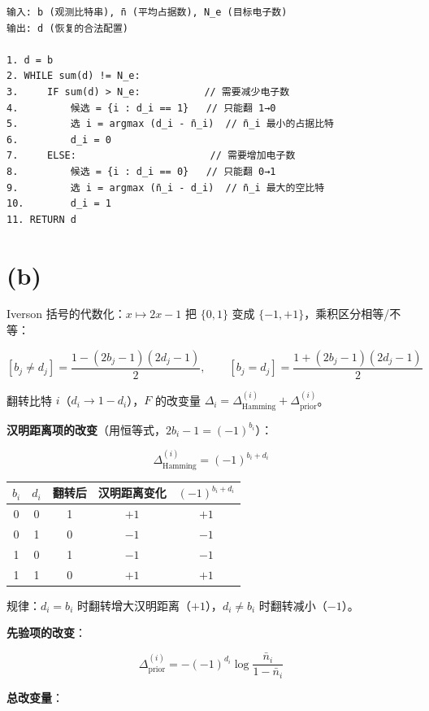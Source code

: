 \documentclass[11pt,a4paper]{article}
\begin{document}
\begin{verbatim}
输入: b (观测比特串), n̄ (平均占据数), N_e (目标电子数)
输出: d (恢复的合法配置)

1. d = b
2. WHILE sum(d) != N_e:
3.     IF sum(d) > N_e:           // 需要减少电子数
4.         候选 = {i : d_i == 1}   // 只能翻 1→0
5.         选 i = argmax (d_i - n̄_i)  // n̄_i 最小的占据比特
6.         d_i = 0
7.     ELSE:                       // 需要增加电子数
8.         候选 = {i : d_i == 0}   // 只能翻 0→1
9.         选 i = argmax (n̄_i - d_i)  // n̄_i 最大的空比特
10.        d_i = 1
11. RETURN d
\end{verbatim}

\section{(b) }

Iverson 括号的代数化：$x \mapsto 2x-1$ 把 $\{0,1\}$ 变成 $\{-1,+1\}$，乘积区分相等/不等：

$$\boxed{[b_j \neq d_j] = \frac{1 - (2b_j-1)(2d_j-1)}{2}}, \qquad \boxed{[b_j = d_j] = \frac{1 + (2b_j-1)(2d_j-1)}{2}}$$


翻转比特 $i$（$d_i \to 1-d_i$），$F$ 的改变量 $\Delta_i = \Delta_{\text{Hamming}}^{(i)} + \Delta_{\text{prior}}^{(i)}$。

\textbf{汉明距离项的改变}（用恒等式，$2b_i-1 = (-1)^{b_i}$）：

$$\Delta_{\text{Hamming}}^{(i)} = (-1)^{b_i + d_i}$$

\begin{center}
\begin{tabular}{ccccc}
  \toprule
  $b_i$ & $d_i$ & 翻转后 & 汉明距离变化 & $(-1)^{b_i+d_i}$ \\
  \midrule
  0 & 0 & 1 & $+1$ & $+1$ \\
  0 & 1 & 0 & $-1$ & $-1$ \\
  1 & 0 & 1 & $-1$ & $-1$ \\
  1 & 1 & 0 & $+1$ & $+1$ \\
  \bottomrule
\end{tabular}
\end{center}

规律：$d_i = b_i$ 时翻转增大汉明距离（$+1$），$d_i \neq b_i$ 时翻转减小（$-1$）。

\textbf{先验项的改变}：

$$\Delta_{\text{prior}}^{(i)} = -(-1)^{d_i} \log\frac{\bar{n}_i}{1-\bar{n}_i}$$

\textbf{总改变量}：
\end{document}

